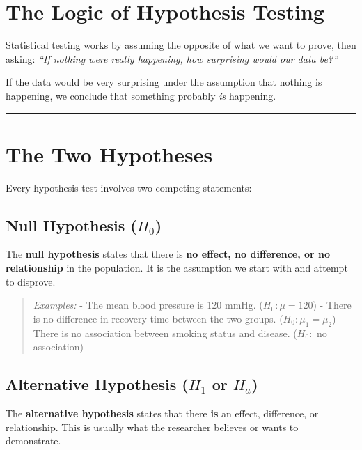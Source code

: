 \documentclass[
  12pt,
  letterpaper,
]{book}
\begin{document}
\section{The Logic of Hypothesis
Testing}\label{the-logic-of-hypothesis-testing}

Statistical testing works by assuming the opposite of what we want to
prove, then asking: \emph{``If nothing were really happening, how
surprising would our data be?''}

If the data would be very surprising under the assumption that nothing
is happening, we conclude that something probably \emph{is} happening.

\begin{center}\rule{0.5\linewidth}{0.5pt}\end{center}

\section{The Two Hypotheses}\label{the-two-hypotheses}

Every hypothesis test involves two competing statements:

\subsection{\texorpdfstring{Null Hypothesis
(\(H_0\))}{Null Hypothesis (H\_0)}}\label{null-hypothesis-h_0}

The \textbf{null hypothesis} states that there is \textbf{no effect, no
difference, or no relationship} in the population. It is the assumption
we start with and attempt to disprove.

\begin{quote}
\emph{Examples:} - The mean blood pressure is 120 mmHg.
(\(H_0: \mu = 120\)) - There is no difference in recovery time between
the two groups. (\(H_0: \mu_1 = \mu_2\)) - There is no association
between smoking status and disease. (\(H_0:\) no association)
\end{quote}

\subsection{\texorpdfstring{Alternative Hypothesis (\(H_1\) or
\(H_a\))}{Alternative Hypothesis (H\_1 or H\_a)}}\label{alternative-hypothesis-h_1-or-h_a}

The \textbf{alternative hypothesis} states that there \textbf{is} an
effect, difference, or relationship. This is usually what the researcher
believes or wants to demonstrate.
\end{document}
